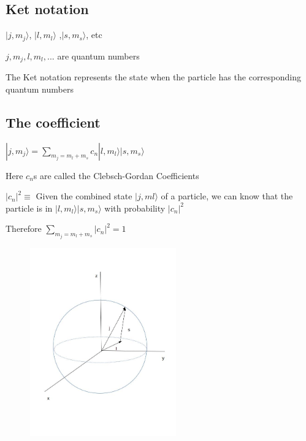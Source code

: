 \documentclass[
paper=128mm:96mm, %
fontsize=11pt, %
pagesize, %
parskip=half-, %
]{scrartcl} %
\theoremstyle{mythmstyle} %
\begin{document}
\subsection{Ket notation}

$|j,m_j\rangle$, $|l,m_l\rangle$ ,$|s,m_s\rangle$, etc

$j,m_j,l,m_l,...$ are quantum numbers

The Ket notation represents the state when the particle has the corresponding quantum numbers

\clearpage


\subsection{The coefficient}

$|j, m_j \rangle = \sum\limits_{m_j = m_l+m_s} c_n |l,m_l\rangle |s,m_s \rangle$

Here $c_n$s  are called the Clebsch-Gordan Coefficients

$|c_n|^2 \equiv$ Given the combined state $|j,ml\rangle$ of a particle, we can know that the particle is in $|l,m_l\rangle|s,m_s\rangle$ with probability $|c_n|^2$

Therefore $\sum\limits_{m_j= m_l+m_s} |c_n|^2 =1$

\clearpage

\begin{figure}

\centering
\includegraphics[height=3.2in]{coordinate}

\end{figure}

\clearpage
\end{document}
